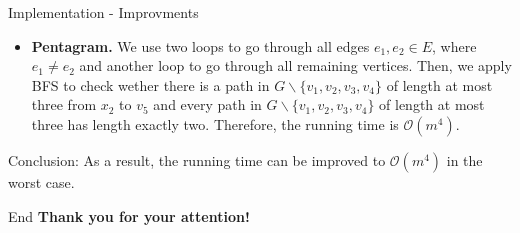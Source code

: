 \documentclass{beamer}
\begin{document}
\begin{frame}{Implementation - Improvments}
    \begin{itemize}
    \item \textbf{Pentagram.}  We use two loops to go through all edges $e_1, e_2 \in E$, where $e_1 \ne e_2$ and another loop to go through all remaining vertices. Then, we apply BFS to check wether there is a path in $G \backslash \{v_1, v_2, v_3, v_4\}$ of length at most three from $x_2$ to $v_5$ and every path in $G \backslash \{v_1, v_2, v_3, v_4\}$ of length at most three has length exactly two. Therefore, the running time is $\mathcal{O}(m^4)$. 

\end{itemize}
\begin{block}{Conclusion:}
As a result, the running time can be improved to $\mathcal{O}(m^4)$ in the worst case. 
\end{block}
\end{frame}


\begin{frame}{End}
    \textbf{\huge Thank you for your attention!}
\end{frame}
\end{document}
